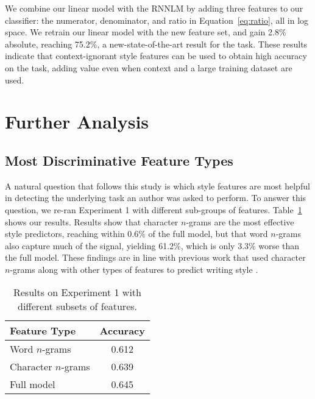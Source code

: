 \documentclass[11pt,a4paper]{article}
\newcommand{\tabref}[1]{Table~\ref{#1}}
\newcommand{\isection}[2]{\section{#1}\label{ssec:#2}}
\newcommand{\com}[1]{}
\newcommand{\resolved}[1]{}
\newcommand{\roy}[1]{{\color{orange}\textsc{[#1 --rs]}}}
\newcommand{\nascomment}[1]{{\color{blue}\textsc{[#1 --nas]}}}
\renewcommand{\roy}[1]{{\color{orange}[#1 --rs]}}
\renewcommand{\roy}[1]{#1}
\renewcommand{\nascomment}[1]{}
\begin{document}
We combine our linear model with the RNNLM by adding three features to
our classifier: the numerator, denominator, and ratio in
Equation~\ref{eq:ratio}, all in log space. %
We retrain our linear  model with the new feature set, and gain 2.8\%
absolute, reaching 75.2\%\com{ (15.3\% better than the published state-of-the-art\com{ and 4.1\% better than the best unpublished} result)}\roy{, a new-state-of-the-art result for the task.}\resolved{\roy{As now the codalab shared task table contains our numbers, I removed the references to these works, and left only the footnote earlier which says that there are higher, unpublished numbers.}}
These results indicate that context-ignorant style features can be used to obtain high
accuracy on the task, adding value even when context and a large
training dataset are used.  \resolved{\nascomment{check reframing here}}




\isection{Further Analysis}{Ablation}

 \resolved{\nascomment{these aren't just ablations, so I retitled}}

\subsection{Most Discriminative Feature Types}
A natural question that follows this study is which style features are most
helpful in detecting the underlying task an author was asked
to perform. 
To answer this question, we re-ran Experiment 1 with different sub-groups of features. 
\tabref{subgroups} shows our results. Results show that  character $n$-grams are the most effective style predictors, reaching within  0.6\% of the full model, but that word $n$-grams also capture much of the signal, yielding 61.2\%, which is only 3.3\% worse than the full model. 
These findings are in line with previous work that used character $n$-grams along with other types of features to predict writing  style \cite{Schwartz:2013}.


\begin{table}[!t]
\begin{center}
\begin{tabular}{|l|c|} \hline
{\bf Feature Type} & {\bf Accuracy}\\ \hline
Word $n$-grams & 0.612 \\ \hline
Character $n$-grams & 0.639 \\ \hline
Full model & 0.645 \\ \hline

\end{tabular}
\end{center}
\caption{\label{subgroups}
Results on Experiment 1 with different subsets of features.
}
\end{table}
\end{document}
